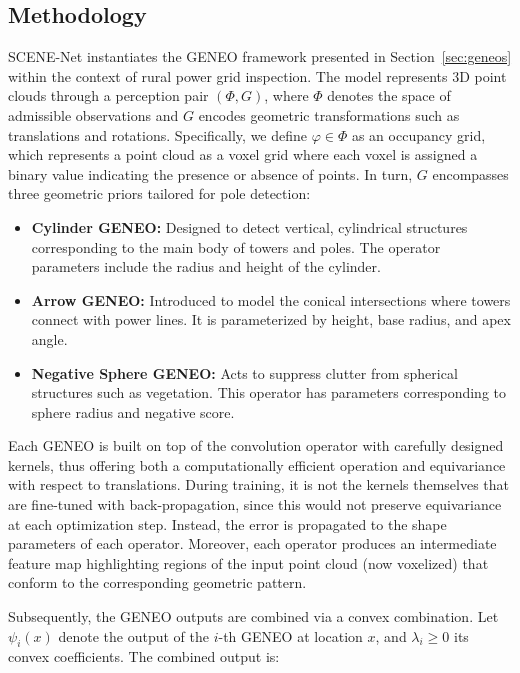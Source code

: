 \subsection{Methodology}

SCENE-Net instantiates the GENEO framework presented in
Section~\ref{sec:geneos} within the context of rural power grid inspection. The
model represents 3D point clouds through a perception pair $(\Phi, G)$, where
$\Phi$ denotes the space of admissible observations and $G$ encodes geometric
transformations such as translations and rotations.
%
Specifically, we define $\varphi \in \Phi$ as an occupancy grid, which
represents a point cloud as a voxel grid where each voxel is assigned a binary
value indicating the presence or absence of points.
%
In turn, $G$ encompasses three geometric priors tailored for pole detection:
\begin{itemize}
      \item \textbf{Cylinder GENEO:}
            Designed to detect vertical, cylindrical structures corresponding
            to the main body of towers and poles. The operator parameters include
            the radius and height of the cylinder.
      \item \textbf{Arrow GENEO:}
            Introduced to model the conical intersections where towers connect
            with power lines. It is parameterized by height, base radius,
            and apex angle.
      \item \textbf{Negative Sphere GENEO:}
            Acts to suppress clutter from spherical structures such as vegetation.
            This operator has parameters corresponding to sphere radius and
            negative score.
\end{itemize}

Each GENEO is built on top of the convolution operator with carefully designed
kernels, thus offering both a computationally efficient operation and
equivariance with respect to translations.
%
During training, it is not the kernels themselves that are fine-tuned with
back-propagation, since this would not preserve equivariance at each
optimization step. Instead, the error is propagated to the shape parameters of
each operator.
%
Moreover, each operator produces an intermediate feature map highlighting
regions of the input point cloud (now voxelized) that conform to the
corresponding geometric pattern.

Subsequently, the GENEO outputs are combined via a convex combination. Let
$\psi_i(x)$ denote the output of the $i$-th GENEO at location $x$, and
$\lambda_i \geq 0$ its convex coefficients. The combined output is:

